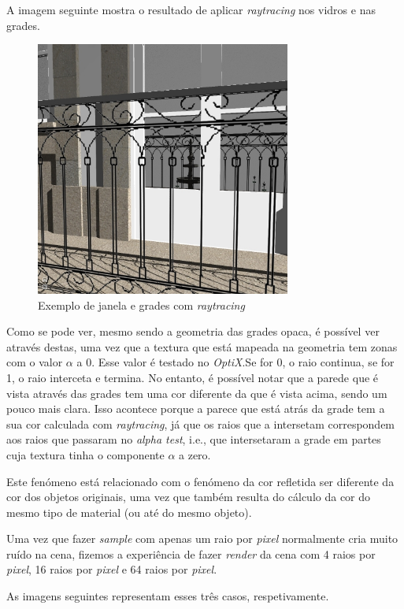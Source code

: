 \documentclass[10pt]{article}
\begin{document}
A imagem seguinte mostra o resultado de aplicar \textit{raytracing} nos vidros e nas grades.

\begin{figure}[H]
    \centering
    \includegraphics[width=3.3in]{reflections.jpg}
    \caption{Exemplo de janela e grades com \textit{raytracing}}
\end{figure}

Como se pode ver, mesmo sendo a geometria das grades opaca, é possível ver através destas, uma vez que a textura que está mapeada na geometria tem zonas com o valor $\alpha$ a 0. Esse valor é testado no \textit{OptiX}.Se for 0, o raio continua, se for 1, o raio interceta e termina. No entanto, é possível notar que a parede que é vista através das grades tem uma cor diferente da que é vista acima, sendo um pouco mais clara. Isso acontece porque a parece que está atrás da grade tem a sua cor calculada com \textit{raytracing}, já que os raios que a intersetam correspondem aos raios que passaram no \textit{alpha test}, i.e., que intersetaram a grade em partes cuja textura tinha o componente $\alpha$ a zero.

Este fenómeno está relacionado com o fenómeno da cor refletida ser diferente da cor dos objetos originais, uma vez que também resulta do cálculo da cor do mesmo tipo de material (ou até do mesmo objeto).

Uma vez que fazer \textit{sample} com apenas um raio por \textit{pixel} normalmente cria muito ruído na cena, fizemos a experiência de fazer \textit{render} da cena com 4 raios por \textit{pixel}, 16 raios por \textit{pixel} e 64 raios por \textit{pixel}.

As imagens seguintes representam esses três casos, respetivamente.
\end{document}
